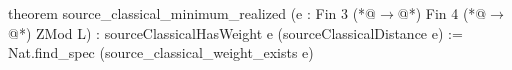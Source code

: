 theorem source_classical_minimum_realized (e : Fin 3 (*@$\to$@*) Fin 4 (*@$\to$@*) ZMod L) :
    sourceClassicalHasWeight e (sourceClassicalDistance e) :=
  Nat.find_spec (source_classical_weight_exists e)
